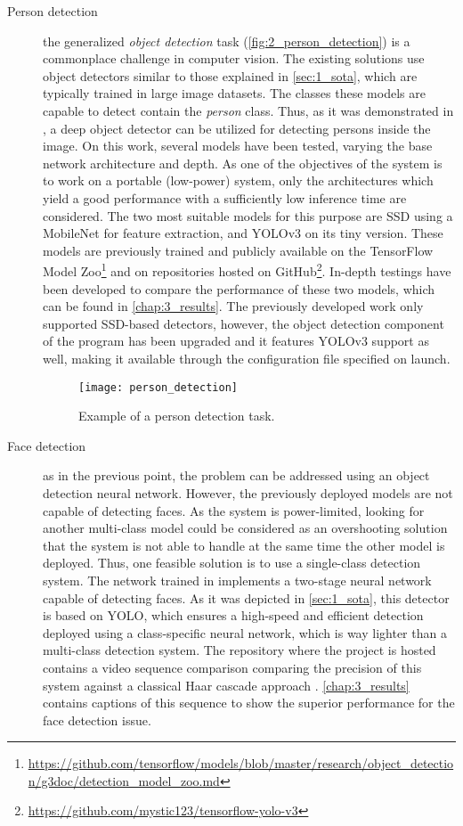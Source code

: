 \begin{description}
	\item[Person detection] the generalized \textit{object detection} task (\autoref{fig:2_person_detection}) is a commonplace challenge in computer vision. The existing solutions use object detectors similar to those explained in \autoref{sec:1_sota}, which are typically trained in large image datasets. The classes these models are capable to detect contain the \textit{person} class. Thus, as it was demonstrated in \cite{tfg}, a deep object detector can be utilized for detecting persons inside the image. On this work, several models have been tested, varying the base network architecture and depth. As one of the objectives of the system is to work on a portable (low-power) system, only the architectures which yield a good performance with a sufficiently low inference time are considered. The two most suitable models for this purpose are SSD \cite{ssd} using a MobileNet \cite{mobilenet} for feature extraction, and YOLOv3 \cite{yolov3} on its tiny version. These models are previously trained and publicly available on the TensorFlow Model Zoo\footnote{\url{https://github.com/tensorflow/models/blob/master/research/object_detection/g3doc/detection_model_zoo.md}} and on repositories hosted on GitHub\footnote{\url{https://github.com/mystic123/tensorflow-yolo-v3}}. In-depth testings have been developed to compare the performance of these two models, which can be found in \autoref{chap:3_results}. The previously developed work \cite{tfg} only supported SSD-based detectors, however, the object detection component of the program has been upgraded and it features YOLOv3 support as well, making it available through the configuration file specified on launch.
	
\begin{figure}[h]
	\centering
	\texttt{[image: person\_detection]}
	\caption{Example of a person detection task.}
	\label{fig:2_person_detection}
\end{figure}
	
	\item[Face detection] as in the previous point, the problem can be addressed using an object detection neural network. However, the previously deployed models are not capable of detecting faces. As the system is power-limited, looking for another multi-class model could be considered as an overshooting solution that the system is not able to handle at the same time the other model is deployed. Thus, one feasible solution is to use a single-class detection system. The network trained in \cite{faced} implements a two-stage neural network capable of detecting faces. As it was depicted in \autoref{sec:1_sota}, this detector is based on YOLO, which ensures a high-speed and efficient detection deployed using a class-specific neural network, which is way lighter than a multi-class detection system. The repository where the project is hosted contains a video sequence comparison comparing the precision of this system against a classical Haar cascade approach \cite{violajones}. \autoref{chap:3_results} contains captions of this sequence to show the superior performance for the face detection issue.
	

\end{description}
